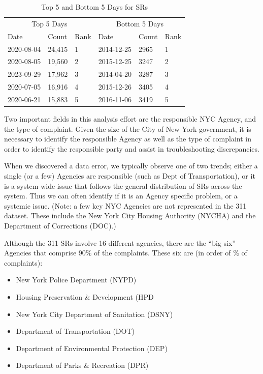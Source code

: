 \documentclass[12pt, titlepage]{article}
\begin{document}
\begin{table}[tbp]
    \centering
    \small
    \caption{Top 5 and Bottom 5 Days for SRs}
    \begin{tabular}{@{}lll lll@{}}
        \toprule
        \multicolumn{3}{c}{Top 5 Days} & \multicolumn{3}{c}{Bottom 5 Days} \\
        \cmidrule(r){1-3} \cmidrule(l){4-6}
        Date & Count & Rank & Date & Count & Rank \\
        \midrule
        2020-08-04 & 24,415 & 1 & 2014-12-25 & 2965 & 1 \\
        2020-08-05 & 19,560 & 2 & 2015-12-25 & 3247 & 2 \\
        2023-09-29 & 17,962 & 3 & 2014-04-20 & 3287 & 3 \\
        2020-07-05 & 16,916 & 4 & 2015-12-26 & 3405 & 4 \\
        2020-06-21 & 15,883 & 5 & 2016-11-06 & 3419 & 5 \\
        \bottomrule
    \end{tabular}
    \label{tab:combined_counts}
\end{table}



Two important fields in this analysis effort are the responsible NYC Agency, and the type of complaint.
Given the size of the City of New York government, it is necessary to identify the responsible Agency as well as the type of complaint in order to 
identify the responsible party and assist in troubleshooting discrepancies.

When we discovered a data error, we typically observe one of two trends; either a single (or a few) Agencies are responsible (such as Dept of Transportation), 
or it is a system-wide issue that follows the general distribution of  SRs across the system. 
Thus we can often identify if it is an Agency specific problem, or a systemic issue.  (Note: a few key NYC Agencies are not 
represented in the 311 dataset. These include the New York City Housing Authority (NYCHA) and the
Department of Corrections (DOC).)

Although the 311 SRs involve 16 different agencies, there are the ``big six'' Agencies that comprise
90\% of the complaints. These six are (in order of \% of complaints):  

\begin{itemize}
	\item New York Police Department (NYPD)
	\item Housing Preservation \& Development (HPD
	\item New York City Department of Sanitation (DSNY)
	\item Department of Transportation (DOT)
	\item Department of Environmental Protection (DEP)
	\item Department of Parks \& Recreation (DPR)
\end{itemize}
\end{document}
